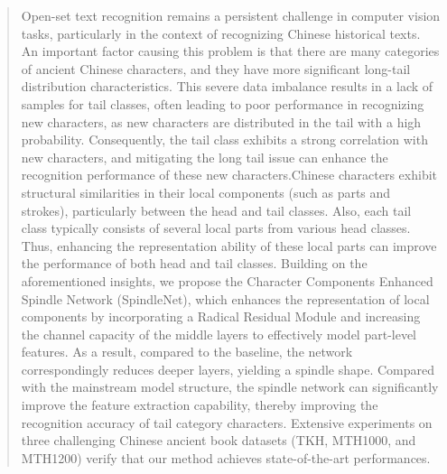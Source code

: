 \begin{abstract}
    Open-set text recognition remains a persistent challenge in computer vision tasks, particularly in the context of recognizing Chinese historical texts. 
    An important factor causing this problem is that there are many categories of ancient Chinese characters, and they have more significant long-tail distribution characteristics.
    This severe data imbalance results in a lack of samples for tail classes, often leading to poor performance in recognizing new characters, as new characters are distributed in the tail with a high probability. Consequently, the tail class exhibits a strong correlation with new characters, and mitigating the long tail issue can enhance the recognition performance of these new characters.Chinese characters exhibit structural similarities in their local components (such as parts and strokes), particularly between the head and tail classes. Also, each tail class typically consists of several local parts from various head classes. Thus, enhancing the representation ability of these local parts can improve the performance of both head and tail classes.
    Building on the aforementioned insights, we propose the Character Components Enhanced Spindle Network (SpindleNet), which enhances the representation of local components by incorporating a Radical Residual Module and increasing the channel capacity of the middle layers to effectively model part-level features.
    As a result, compared to the baseline, the network correspondingly reduces deeper layers, yielding a spindle shape.
    Compared with the mainstream model structure, the spindle network can significantly improve the feature extraction capability, thereby improving the recognition accuracy of tail category characters.
    Extensive experiments on three challenging Chinese ancient book datasets (TKH, MTH1000, and MTH1200) verify that our method achieves state-of-the-art performances.
\end{abstract}
